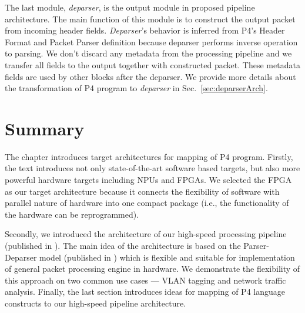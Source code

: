The last module, \emph{deparser}, is the output module in proposed pipeline architecture. 
The main function of this module is to construct the output packet from incoming header fields.
\textit{Deparser}'s behavior is inferred from P4's Header Format and Packet Parser definition because deparser performs inverse operation to parsing.  
We don't discard any metadata from the processing pipeline and we transfer all fields to the output together with constructed packet. 
These metadata fields are used by other blocks after the deparser. 
We provide more details about the transformation of P4 program to \emph{deparser} in Sec.~\ref{sec:deparserArch}.

\section{Summary}
The chapter introduces target architectures for mapping of P4 program. 
Firstly, the text introduces not only state-of-the-art software based targets, but also more powerful hardware targets including NPUs and FPGAs.
We selected the FPGA as our target architecture because it connects the flexibility of software with parallel nature of hardware into one
compact package (i.e., the functionality of the hardware can be reprogrammed). 

Secondly, we introduced the architecture of our high-speed processing pipeline (published in \cite{2016h2rc-p4}).
The main idea of the architecture is based on the Parser-Deparser model (published in \cite{2016MicproP4}) which is flexible and suitable 
for implementation of general packet processing engine in hardware.
We demonstrate the flexibility of this approach on two common use cases --- VLAN tagging and network traffic analysis.
Finally, the last section introduces ideas for mapping of P4 language constructs
to our high-speed pipeline architecture. %
